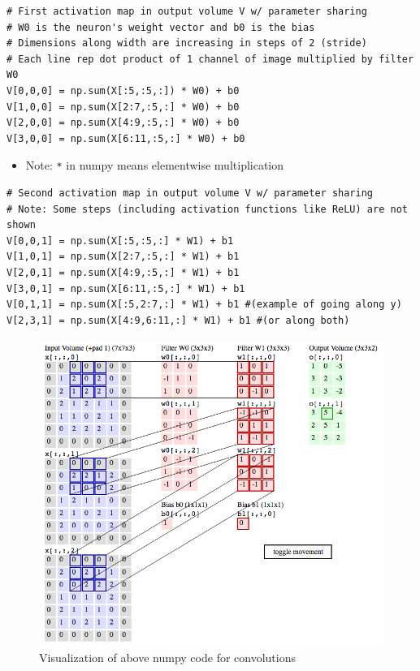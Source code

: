 \documentclass[a4paper,12pt]{article}
\begin{document}
\begin{lstlisting}
# First activation map in output volume V w/ parameter sharing
# W0 is the neuron's weight vector and b0 is the bias
# Dimensions along width are increasing in steps of 2 (stride)
# Each line rep dot product of 1 channel of image multiplied by filter W0
V[0,0,0] = np.sum(X[:5,:5,:]) * W0) + b0
V[1,0,0] = np.sum(X[2:7,:5,:] * W0) + b0
V[2,0,0] = np.sum(X[4:9,:5,:] * W0) + b0
V[3,0,0] = np.sum(X[6:11,:5,:] * W0) + b0
\end{lstlisting}

\begin{itemize}
  \item Note: \lstinline{*} in numpy means elementwise multiplication
\end{itemize}

\begin{lstlisting}
# Second activation map in output volume V w/ parameter sharing
# Note: Some steps (including activation functions like ReLU) are not shown
V[0,0,1] = np.sum(X[:5,:5,:] * W1) + b1
V[1,0,1] = np.sum(X[2:7,:5,:] * W1) + b1
V[2,0,1] = np.sum(X[4:9,:5,:] * W1) + b1
V[3,0,1] = np.sum(X[6:11,:5,:] * W1) + b1
V[0,1,1] = np.sum(X[:5,2:7,:] * W1) + b1 #(example of going along y)
V[2,3,1] = np.sum(X[4:9,6:11,:] * W1) + b1 #(or along both)
\end{lstlisting}

\pagebreak

\begin{figure}[th]
  \centering
  \includegraphics[width=165mm, scale=1]{images/Convolution-Visualization.png}
  \caption{Visualization of above numpy code for convolutions}
  \label{Visualization}
\end{figure}
\end{document}
